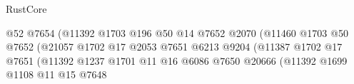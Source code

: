 \begin{lexlean}{RustCore}
\begin{coremodule}
                                                          @52
                                                          @7654
                                                          (@11392
                                                            @1703
                                                            @196
                                                            @50
                                                            @14
                                                            @7652
                                                            @2070
                                                            (@11460
                                                              @1703
                                                              @50
                                                              @7652
                                                              (@21057
                                                                @1702
                                                                @17
                                                                @2053
                                                                @7651
                                                                @6213
                                                                @9204
                                                                (@11387
                                                                  @1702
                                                                  @17
                                                                  @7651
                                                                  (@11392
                                                                    @1237
                                                                    @1701
                                                                    @11
                                                                    @16
                                                                    @6086
                                                                    @7650
                                                                    @20666
                                                                    (@11392
                                                                      @1699
                                                                      @1108
                                                                      @11
                                                                      @15
                                                                      @7648

\end{coremodule}
\end{lexlean}
